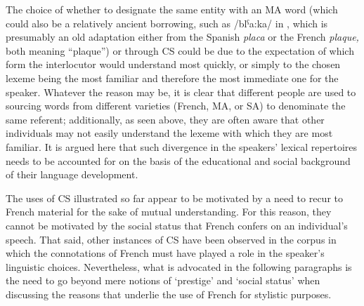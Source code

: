 \documentclass[output=paper]{langscibook}
\begin{document}
The choice of whether to designate the same entity with an \gls*{MA} word (which could also be a relatively ancient borrowing, such as /blˁa:ka/ in , which is presumably an old adaptation either from the Spanish \textit{placa} or the French \textit{plaque,} both meaning ``plaque'') or through \gls*{CS} could be due to the expectation of which form the interlocutor would understand most quickly, or simply to the chosen lexeme being the most familiar and therefore the most immediate one for the speaker. Whatever the reason may be, it is clear that different people are used to sourcing words from different varieties (French, \gls*{MA}, or \gls*{SA}) to denominate the same referent; additionally, as seen above, they are often aware that other individuals may not easily understand the lexeme with which they are most familiar. It is argued here that such divergence in the speakers’ lexical repertoires needs to be accounted for on the basis of the educational and social background of their language development.

\largerpage
The uses of \gls*{CS} illustrated so far appear to be motivated by a need to recur to French material for the sake of mutual understanding. For this reason, they cannot be motivated by the social status that French confers on an individual’s speech. That said, other instances of \gls*{CS} have been observed in the corpus in which the connotations of French must have played a role in the speaker’s linguistic choices. Nevertheless, what is advocated in the following paragraphs is the need to go beyond mere notions of ‘prestige' and ‘social status' when discussing the reasons that underlie the use of French for stylistic purposes.
\end{document}
